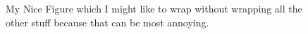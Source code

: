 

\begin{figure}[htbp] 
	\centering
 	\caption{My Nice Figure which I might like to wrap without wrapping all the
other stuff because that can be most annoying.}
	\label{fig:myfigure}
\end{figure}

